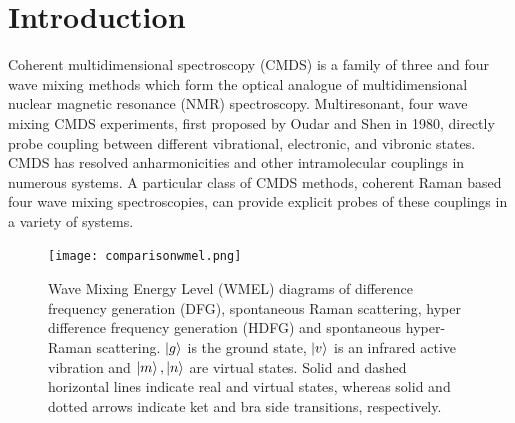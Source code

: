 \documentclass[aip, jcp, reprint, twocolumn]{revtex4-2}
\begin{document}
\section{Introduction}
Coherent multidimensional spectroscopy (CMDS) is a family of three and four wave mixing methods which form the optical analogue of multidimensional nuclear magnetic resonance (NMR) spectroscopy.\cite{RN103, Cho2008, RN335}
Multiresonant, four wave mixing CMDS experiments, first proposed by Oudar and Shen in 1980,\cite{RN307} directly probe coupling between different vibrational, electronic, and vibronic states. \cite{RN307, RN281, RN103, RN342, Cho2008, RN335, Ogilvie2019, RN325} 
CMDS has resolved anharmonicities and other intramolecular couplings in numerous systems. \cite{RN345, RN342, RN343, RN324, RN329, RN120, Czech2015, Gaynor2017, Ogilvie2019, RN325}
A particular class of CMDS methods, coherent Raman based four wave mixing spectroscopies, can provide explicit probes of these couplings in a variety of systems. \cite{RN103, RN335}

\begin{figure}[!htbp]
	\centering
	\texttt{[image: comparisonwmel.png]}
	\caption{Wave Mixing Energy Level (WMEL) diagrams of difference frequency generation (DFG), spontaneous Raman scattering, hyper difference frequency generation (HDFG) and spontaneous hyper-Raman scattering. \cite{RN286, RN352}
		$\ket{g}$ is the ground state, $\ket{v}$ is an infrared active vibration and $\ket{m}, \ket{n}$ are virtual states.
		Solid and dashed horizontal lines indicate real and virtual states, whereas solid and dotted arrows indicate ket and bra side transitions, respectively. 
		}
	\label{fig:comparisonwmel}
\end{figure}
\end{document}
